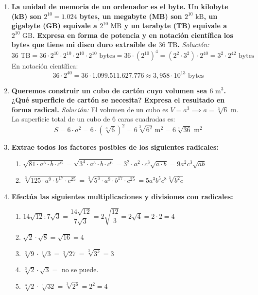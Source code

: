 \documentclass[a4paper,12pt]{article}
\begin{document}
\begin{enumerate}
    \item \textbf{La unidad de memoria de un ordenador es el byte. Un kilobyte (kB) son $2^{10} = 1.024$ bytes, un megabyte (MB) son $2^{10}\text{ kB}$, un gigabyte (GB) equivale a $2^{10}\text{ MB}$ y un terabyte (TB) equivale a $2^{10}\text{ GB}$. Expresa en forma de potencia y en notación científica los bytes que tiene mi disco duro extraíble de $36\text{ TB}$.}
        \textit{Solución:}
        \[
        36\text{ TB} = 36 \cdot 2^{10} \cdot 2^{10} \cdot 2^{10} \cdot 2^{10}\text{ bytes} = 36 \cdot (2^{10})^{4} = (2^{2} \cdot 3^{2}) \cdot 2^{40} = 3^{2} \cdot 2^{42}\text{ bytes}
        \]
        En notación científica:
        \[
        36 \cdot 2^{40} = 36 \cdot 1.099.511.627.776 \approx 3,958 \cdot 10^{13}\text{ bytes}
        \]

    \item \textbf{Queremos construir un cubo de cartón cuyo volumen sea $6\text{ m}^{3}$. ¿Qué superficie de cartón se necesita? Expresa el resultado en forma radical.}
        \textit{Solución:}
        El volumen de un cubo es $V = a^{3} \implies a = \sqrt[3]{6}\text{ m}$.
        La superficie total de un cubo de 6 caras cuadradas es:
        \[
        S = 6 \cdot a^{2} = 6 \cdot (\sqrt[3]{6})^{2} = 6\sqrt[3]{6^{2}}\text{ m}^{2} = 6\sqrt[3]{36}\text{ m}^{2}
        \]

    \item \textbf{Extrae todos los factores posibles de los siguientes radicales:}
        \begin{enumerate}[label=\alph*)]
            \item $\sqrt{81 \cdot a^{5} \cdot b \cdot c^{6}} = \sqrt{3^{4} \cdot a^{5} \cdot b \cdot c^{6}} = 3^{2} \cdot a^{2} \cdot c^{3} \sqrt{a \cdot b} = 9 a^{2} c^{3} \sqrt{a b}$
            \item $\sqrt[3]{125 \cdot a^{9} \cdot b^{17} \cdot c^{25}} = \sqrt[3]{5^{3} \cdot a^{9} \cdot b^{17} \cdot c^{25}} = 5 a^{3} b^{5} c^{8} \sqrt[3]{b^{2} c}$
        \end{enumerate}

    \item \textbf{Efectúa las siguientes multiplicaciones y divisiones con radicales:}
        \begin{enumerate}[label=\alph*)]
            \item $14\sqrt{12} : 7\sqrt{3} = \dfrac{14\sqrt{12}}{7\sqrt{3}} = 2\sqrt{\dfrac{12}{3}} = 2\sqrt{4} = 2 \cdot 2 = 4$
            \item $\sqrt{2} \cdot \sqrt{8} = \sqrt{16} = 4 $
            \item $ \sqrt[3]{9} \cdot \sqrt[3]{3} = \sqrt[3]{27} = \sqrt[3]{3^3} = 3 $ 
            \item $\sqrt[3]{2} \cdot \sqrt{3} = $ no se puede. 
            \item $ \sqrt[3]{2} \cdot \sqrt[3]{32} = \sqrt[3]{2^6} = 2^2 = 4$ 
        \end{enumerate}


\end{enumerate}
\end{document}
